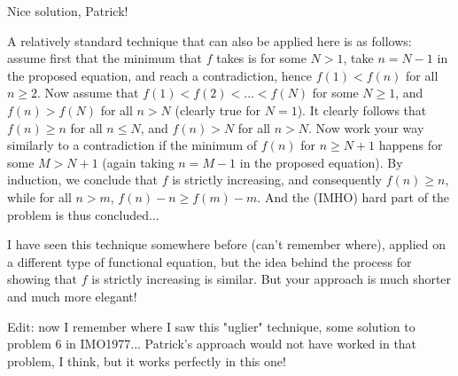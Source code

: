 \begin{solution}
	Nice solution, Patrick!

A relatively standard technique that can also be applied here is as follows: assume first that the minimum that $f$ takes is for some $N>1$, take $n=N-1$ in the proposed equation, and reach a contradiction, hence $f(1)<f(n)$ for all $n\geq2$. Now assume that $f(1)<f(2)<\dots<f(N)$ for some $N\geq1$, and $f(n)>f(N)$ for all $n>N$ (clearly true for $N=1$). It clearly follows that $f(n)\geq n$ for all $n\leq N$, and $f(n)>N$ for all $n>N$. Now work your way similarly to a contradiction if the minimum of $f(n)$ for $n\geq N+1$ happens for some $M>N+1$ (again taking $n=M-1$ in the proposed equation).  By induction, we conclude that $f$ is strictly increasing, and consequently $f(n)\geq n$, while for all $n>m$, $f(n)-n\geq f(m)-m$. And the (IMHO) hard part of the problem is thus concluded...

I have seen this technique somewhere before (can't remember where), applied on a different type of functional equation, but the idea behind the process for showing that $f$ is strictly increasing is similar. But your approach is much shorter and much more elegant!

Edit: now I remember where I saw this "uglier" technique, some solution to problem 6 in IMO1977... Patrick's approach would not have worked in that problem, I think, but it works perfectly in this one!
\end{solution}



